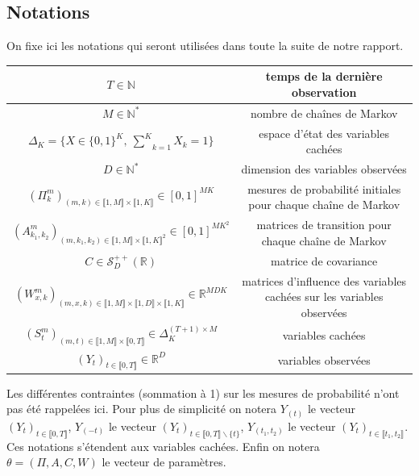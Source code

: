 \documentclass[10pt,a4paper]{article}
\begin{document}
\subsection{Notations}
On fixe ici les notations qui seront utilisées dans toute la suite de notre rapport.
\newline
\begin{center}
\begin{tabular}{|c|c|} 
\hline
$T \in \mathbb{N}$ & temps de la dernière observation \\ \hline
$M \in \mathbb{N}^*$ & nombre de chaînes de Markov \\ \hline
$\Delta_K=\lbrace X \in \lbrace0,1\rbrace^K, \ \underset{k=1}{\overset{K}{\sum}}X_k=1\rbrace$ & espace d'état des variables cachées \\ \hline
$D \in \mathbb{N}^*$ & dimension des variables observées \\ \hline
$(\Pi_{k}^m)_{(m,k) \in \llbracket 1,M \rrbracket \times \llbracket 1,K \rrbracket} \in [0,1]^{MK}$ & mesures de probabilité initiales pour chaque chaîne de Markov \\ \hline
$(A_{k_1,k_2}^m)_{(m,k_1,k_2) \in \llbracket 1,M \rrbracket \times \llbracket 1,K \rrbracket^2} \in [0,1]^{MK^2}$ & matrices de transition pour chaque chaîne de Markov \\ \hline
$C \in \mathcal{S}_D^{++}(\mathbb{R})$ & matrice de covariance \\ \hline
$(W_{x,k}^m)_{(m,x,k) \in \llbracket 1,M \rrbracket \times \llbracket 1,D \rrbracket \times \llbracket 1,K \rrbracket} \in \mathbb{R}^{MDK}$ & matrices d'influence des variables cachées sur les variables observées \\ \hline
$(S_t^m)_{(m,t) \in \llbracket 1,M \rrbracket \times \llbracket 0,T \rrbracket } \in \Delta_K^{(T+1)\times M}$ & variables cachées \\ \hline
$(Y_t)_{t \in \llbracket 0,T \rrbracket} \in \mathbb{R}^D$ & variables observées \\ \hline
\end{tabular}
\end{center}

Les différentes contraintes (sommation à 1) sur les mesures de probabilité n'ont pas été rappelées ici. Pour plus de simplicité on notera $Y_{(t)}$ le vecteur $(Y_t)_{t \in \llbracket 0,T \rrbracket}$, $Y_{(-t)}$ le vecteur $(Y_{t})_{t \in \llbracket 0,T \rrbracket\backslash \lbrace t \rbrace}$, $Y_{(t_1,t_2)}$ le vecteur $(Y_t)_{t \in \llbracket t_1,t_2 \rrbracket}$. Ces notations s'étendent aux variables cachées. Enfin on notera $\theta=(\Pi, A,C,W)$ le vecteur de paramètres.
\end{document}
